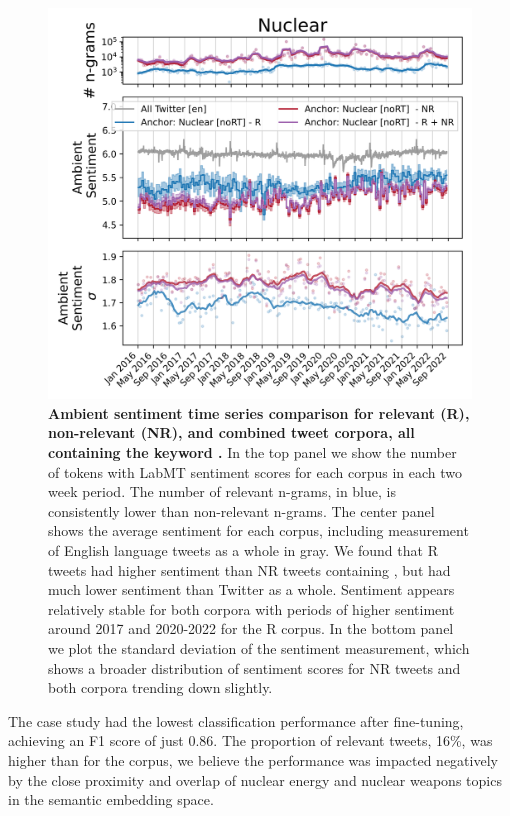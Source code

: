 \begin{figure}[tp!]
  \centering	
    \includegraphics[width=0.98\columnwidth]{figures/Nuclear_sentiment_2016-01-01_2022-08-31.png}  
  \caption{
    \textbf{Ambient sentiment time series comparison for relevant (R), non-relevant (NR), and combined tweet corpora,
    all containing the keyword .}
    In the top panel
    we show the number of tokens with LabMT \cite{dodds2015human}
    sentiment scores for each corpus in each two week period.
    The number of relevant n-grams,
    in blue,
    is consistently lower than non-relevant n-grams. 
    The center panel shows the average sentiment for each corpus,
    including measurement of English language tweets as a whole in gray. 
    We found that
    R tweets had higher sentiment than NR tweets
    containing ,
    but had much lower sentiment than Twitter as a whole.
    Sentiment appears relatively stable for both corpora
    with periods of higher sentiment around 2017 and 2020-2022 for the R corpus.
    In the bottom panel we plot the standard deviation of the sentiment measurement, which shows a broader distribution of sentiment scores for NR tweets and both corpora trending down slightly. 
  }
  \label{fig:nuclear_sentiment}
\end{figure}

The  case study had the lowest classification performance after fine-tuning, 
achieving an F1 score of just 0.86. 
The proportion of relevant tweets, 16\%, was higher than for the  corpus, 
we believe the performance was impacted negatively by the close proximity and overlap
of nuclear energy and nuclear weapons topics in the semantic embedding space. 

